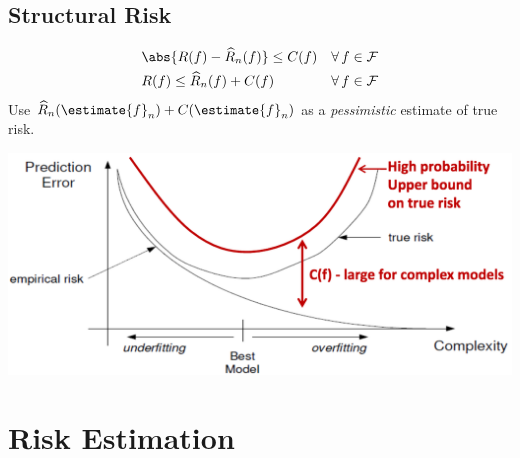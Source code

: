 \documentclass[18pt,a3paper,landscape, ncols=3]{cheatsheet}
\begin{document}
	\subsection{Structural Risk}
		\begin{mdframed}
			\begin{minipage}{0.35\linewidth}
				\begin{align*}
					& \abs{R(f) - \widehat{R}_{n}(f)} \leq C(f) & \forall\, f \in \mathcal{F} \\
					& R(f) \leq \widehat{R}_{n}(f) + C(f) & \forall\, f \in \mathcal{F}\\
				\end{align*}
				Use \(\widehat{R}_{n}(\estimate{f}_{n}) + C(\estimate{f}_{n})\) as a \textit{pessimistic} estimate of true risk.
			\end{minipage}%
			\begin{minipage}{0.65\linewidth}
				\includegraphics[width=\linewidth]{structural_risk_curve.png}
			\end{minipage}
		\end{mdframed}

	\section{Risk Estimation}
\end{document}
